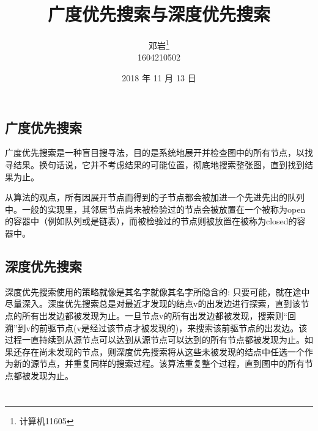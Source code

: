 \documentclass[12pt,a4paper]{article}
\begin{document}
\title{广度优先搜索与深度优先搜索}
\author{邓岩\footnote{计算机11605} \\ 1604210502}
\date{2018 年 11 月 13 日}
\maketitle
\thispagestyle{empty}
\newpage



\section{\color[rgb]{0.2,0.4,0.6}{算法描述}}
\subsection{广度优先搜索}
\begin{spacing}{2.0}
广度优先搜索是一种盲目搜寻法，目的是系统地展开并检查图中的所有节点，以找寻结果。换句话说，它并不考虑结果的可能位置，彻底地搜索整张图，直到找到结果为止。
\par 从算法的观点，所有因展开节点而得到的子节点都会被加进一个先进先出的队列中。一般的实现里，其邻居节点尚未被检验过的节点会被放置在一个被称为open的容器中（例如队列或是链表），而被检验过的节点则被放置在被称为closed的容器中。
\end{spacing}

\subsection{深度优先搜索}
\begin{spacing}{2.0}
深度优先搜索使用的策略就像是其名字就像其名字所隐含的: 只要可能，就在途中尽量深入。深度优先搜索总是对最近才发现的结点v的出发边进行探索，直到该节点的所有出发边都被发现为止。一旦节点v的所有出发边都被发现，搜索则“回溯”到v的前驱节点(v是经过该节点才被发现的)，来搜索该前驱节点的出发边。该过程一直持续到从源节点可以达到从源节点可以达到的所有节点都被发现为止。如果还存在尚未发现的节点，则深度优先搜索将从这些未被发现的结点中任选一个作为新的源节点，并重复同样的搜索过程。该算法重复整个过程，直到图中的所有节点都被发现为止。
\end{spacing}

\newpage

\section{\color[rgb]{0.2,0.4,0.6}{程序}}
\end{document}
